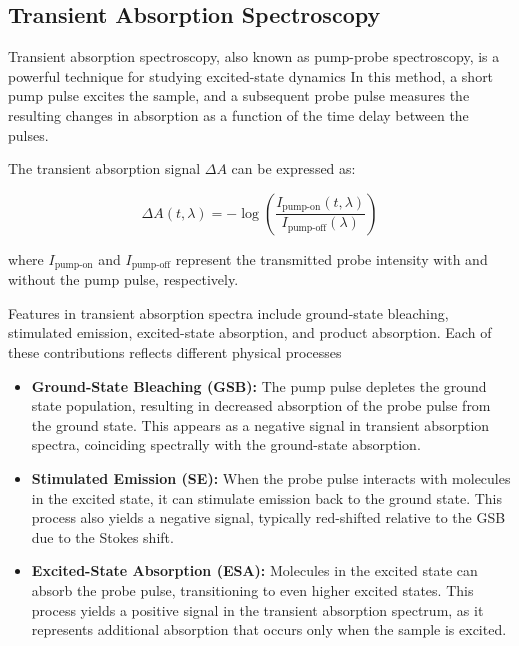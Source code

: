 \subsection{Transient Absorption Spectroscopy}
\label{subsec:transient_absorption}

\noindent Transient absorption spectroscopy, also known as pump-probe spectroscopy, is a powerful technique for studying excited-state dynamics %
In this method, a short pump pulse excites the sample, and a subsequent probe pulse measures the resulting changes in absorption as a function of the time delay between the pulses.

\noindent The transient absorption signal $\Delta A$ can be expressed as:

\begin{equation}
    \Delta A(t, \lambda) = -\log\left(\frac{I_{\text{pump-on}}(t, \lambda)}{I_{\text{pump-off}}(\lambda)}\right)
    \label{eq:transient_absorption}
\end{equation}

\noindent where $I_{\text{pump-on}}$ and $I_{\text{pump-off}}$ represent the transmitted probe intensity with and without the pump pulse, respectively.

\noindent Features in transient absorption spectra include ground-state bleaching, stimulated emission, excited-state absorption, and product absorption. Each of these contributions reflects different physical processes %

\begin{itemize}
    \item \textbf{Ground-State Bleaching (GSB):} The pump pulse depletes the ground state population, resulting in decreased absorption of the probe pulse from the ground state. This appears as a negative signal in transient absorption spectra, coinciding spectrally with the ground-state absorption.

    \item \textbf{Stimulated Emission (SE):} When the probe pulse interacts with molecules in the excited state, it can stimulate emission back to the ground state. This process also yields a negative signal, typically red-shifted relative to the GSB due to the Stokes shift.

    \item \textbf{Excited-State Absorption (ESA):} Molecules in the excited state can absorb the probe pulse, transitioning to even higher excited states. This process yields a positive signal in the transient absorption spectrum, as it represents additional absorption that occurs only when the sample is excited.
\end{itemize}

